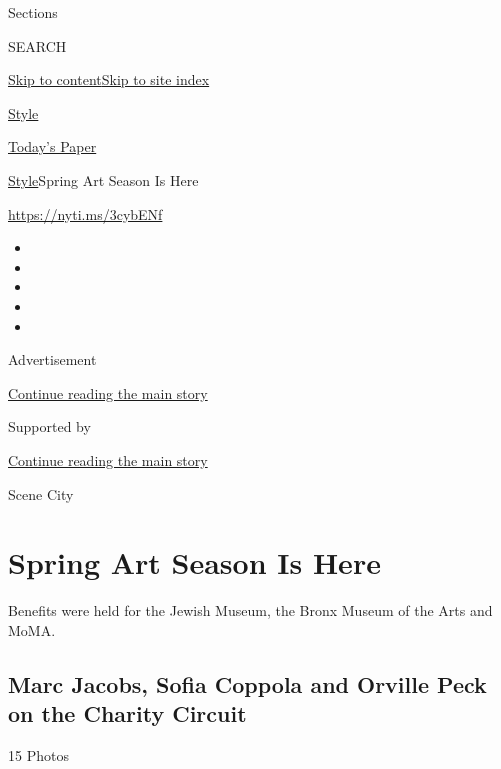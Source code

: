 Sections

SEARCH

\protect\hyperlink{site-content}{Skip to
content}\protect\hyperlink{site-index}{Skip to site index}

\href{https://www.nytimes3xbfgragh.onion/section/style}{Style}

\href{https://myaccount.nytimes3xbfgragh.onion/auth/login?response_type=cookie\&client_id=vi}{}

\href{https://www.nytimes3xbfgragh.onion/section/todayspaper}{Today's
Paper}

\href{/section/style}{Style}\textbar{}Spring Art Season Is Here

\url{https://nyti.ms/3cybENf}

\begin{itemize}
\item
\item
\item
\item
\item
\end{itemize}

Advertisement

\protect\hyperlink{after-top}{Continue reading the main story}

Supported by

\protect\hyperlink{after-sponsor}{Continue reading the main story}

Scene City

\hypertarget{spring-art-season-is-here}{%
\section{Spring Art Season Is Here}\label{spring-art-season-is-here}}

Benefits were held for the Jewish Museum, the Bronx Museum of the Arts
and MoMA.

\href{https://www.nytimes3xbfgragh.onion/slideshow/2020/03/06/fashion/marc-jacobs-sofia-coppola-and-orville-peck-on-the-charity-circuit.html}{}

\hypertarget{marc-jacobs-sofia-coppola-and-orville-peck-on-the-charity-circuit}{%
\subsection{Marc Jacobs, Sofia Coppola and Orville Peck on the Charity
Circuit}\label{marc-jacobs-sofia-coppola-and-orville-peck-on-the-charity-circuit}}

15 Photos

